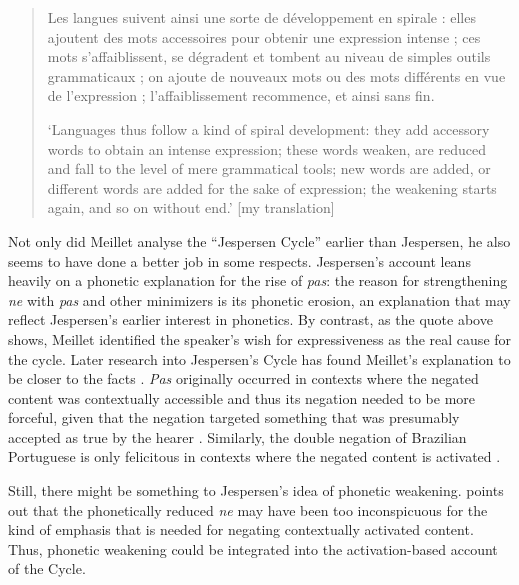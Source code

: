 \documentclass[output=chapter]{langscibook}
\begin{document}
\begin{quote}
Les langues suivent ainsi une sorte de développement en spirale : elles ajoutent des mots accessoires pour obtenir une expression intense ; ces mots s’affaiblissent, se dégradent et tombent au niveau de simples outils grammaticaux ; on ajoute de nouveaux mots ou des mots différents en vue de l’expression ; l’affaiblissement recommence, et ainsi sans fin.

\medskip

\noindent
`Languages thus follow a kind of spiral development: they add accessory words to obtain an intense expression; these words weaken, are reduced and fall to the level of mere grammatical tools; new words are added, or different words are added for the sake of %
expression; the weakening starts again, and so on %
without end.'\hfill
\citep[130--148]{Meillet1921} [my translation]
\end{quote}


Not only did Meillet analyse the ``Jespersen Cycle'' earlier than Jespersen, he also seems to have done a better job in some respects. Jespersen’s account leans heavily on a phonetic explanation for the rise of \textit{pas}: the reason for strengthening \textit{ne} with \textit{pas} and other minimizers is its phonetic erosion, an explanation that may reflect Jespersen’s earlier interest in phonetics. By contrast, as the quote above %
shows, Meillet identified the speaker’s wish for expressiveness as the real cause for the cycle. Later research into %
Jespersen's Cycle has found Meillet’s explanation to be closer to the facts \citep[see][]{Auwera2009}. \textit{Pas} originally occurred in contexts where the negated content was contextually accessible and thus its negation needed to be more forceful, given that the negation targeted something that was presumably accepted as true by the hearer \citep{HansenVisconti2009}. Similarly, the double negation of Brazilian Portuguese is only felicitous in contexts where the negated content is activated \citep{Schwenter2005}.

Still, there might be something to Jespersen’s idea of phonetic weakening.  points out that the phonetically reduced \textit{ne} may have been too inconspicuous for the kind of emphasis that is needed for negating contextually activated content. Thus, phonetic weakening could be integrated into the activation-based account of the Cycle.
\end{document}
